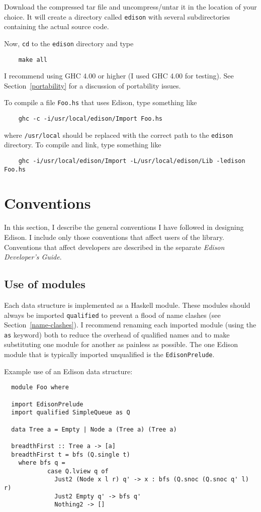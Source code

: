 \documentclass{report}
\newcommand{\cd}{\texttt}
\newcommand{\Section}[1]{Section~\ref{#1}}
\begin{document}
Download the compressed tar file and uncompress/untar it in the
location of your choice.  It will create a directory called
\texttt{edison} with several subdirectories containing the actual
source code.

Now, \cd{cd} to the \cd{edison} directory and type
\begin{verbatim}
    make all
\end{verbatim}
I recommend using GHC 4.00 or higher (I used GHC 4.00 for testing).
See \Section{portability} for a discussion of portability issues.

To compile a file \cd{Foo.hs} that uses Edison, type something like
\begin{verbatim}
    ghc -c -i/usr/local/edison/Import Foo.hs
\end{verbatim}
where \cd{/usr/local} should be replaced with the correct path
to the \cd{edison} directory.  To compile and link, type something
like
\begin{verbatim}
    ghc -i/usr/local/edison/Import -L/usr/local/edison/Lib -ledison Foo.hs
\end{verbatim}



\chapter{Conventions}

In this section, I describe the general conventions I have followed
in designing Edison.  I include only those conventions that affect
users of the library.  Conventions that affect developers are described
in the separate \emph{Edison Developer's Guide}.

\section{Use of modules} \label{use-of-modules}

Each data structure is implemented as a Haskell module.  These
modules should always be imported \cd{qualified} to prevent a flood of
name clashes (see \Section{name-clashes}).  
I recommend renaming each imported module (using the
\cd{as} keyword) both to reduce the overhead of qualified names and to
make substituting one module for another as painless as possible.
The one Edison module that is typically imported unqualified is the
\cd{EdisonPrelude}.

\bigskip \noindent
Example use of an Edison data structure:
\begin{verbatim}
  module Foo where

  import EdisonPrelude
  import qualified SimpleQueue as Q

  data Tree a = Empty | Node a (Tree a) (Tree a)

  breadthFirst :: Tree a -> [a]
  breadthFirst t = bfs (Q.single t)
    where bfs q = 
            case Q.lview q of
              Just2 (Node x l r) q' -> x : bfs (Q.snoc (Q.snoc q' l) r)
              Just2 Empty q' -> bfs q'
              Nothing2 -> []
\end{verbatim}
\end{document}
